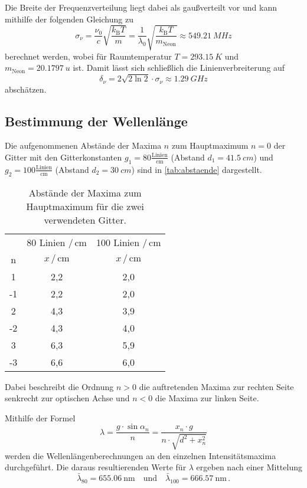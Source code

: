 Die Breite der Frequenzverteilung liegt dabei als gaußverteilt vor und kann mithilfe der folgenden Gleichung zu
\begin{equation*}
    \sigma_\nu = \frac{\nu_0}{c} \sqrt{\frac{k_{\mathrm{B}} T}{m}} = \frac{1}{\lambda_0} \sqrt{\frac{k_{\mathrm{B}} T}{m_\text{Neon}}} \approx \qty{549,21}{MHz}
\end{equation*}
berechnet werden, wobei für Raumtemperatur $T = \qty{293.15}{K}$ und $m_\text{Neon} = \qty{20.1797}{u}$ ist.
Damit lässt sich schließlich die Linienverbreiterung auf
\begin{equation*}
    \delta_\nu =2 \sqrt{2 \ln 2} \cdot \sigma_\nu \approx \qty{1.29}{GHz}
\end{equation*}
abschätzen.

\subsection{Bestimmung der Wellenlänge} \label{sec:lambda}
Die aufgenommenen Abstände der Maxima $n$ zum Hauptmaximum $n = 0$ der Gitter mit den Gitterkonstanten $g_1 = 80 \frac{\text{Linien}}{\unit{\centi\meter}}$ (Abstand $d_1 = \qty{41,5}{cm}$) und
$g_2 = 100 \frac{\text{Linien}}{\unit{\centi\meter}}$ (Abstand $d_2 = \qty{30}{cm}$) sind in \autoref{tab:abstaende} dargestellt.
\begin{table}
    \centering
    \caption{Abstände der Maxima zum Hauptmaximum für die zwei verwendeten Gitter.}
    \label{tab:abstaende}
    \begin{tabular}{c c c}
        \toprule
           &  80 Linien $/ \, \mathrm{cm}$ &  100 Linien $/ \, \mathrm{cm}$ \\
         n &  $x \, / \, \mathrm{cm}$ &  $x \, / \, \mathrm{cm}$ \\
        \midrule
         1 &     2,2 &       2,0 \\
        -1 &     2,2 &       2,0 \\
         2 &     4,3 &       3,9 \\
        -2 &     4,3 &       4,0 \\
         3 &     6,3 &       5,9 \\
        -3 &     6,6 &       6,0 \\
        \bottomrule
    \end{tabular}
\end{table}
Dabei beschreibt die Ordnung $n>0$ die auftretenden Maxima zur rechten Seite
senkrecht zur optischen Achse und $n<0$ die Maxima zur linken Seite.

Mithilfe der Formel
\begin{equation}
    \lambda=\frac{g \cdot \sin \alpha_n}{n} = \frac{x_n \cdot g}{n \cdot \sqrt{d^2+x_n^2}}
\end{equation} 
werden die Wellenlängenberechnungen an den einzelnen Intensitätsmaxima durchgeführt. 
Die daraus resultierenden Werte für $\lambda$ ergeben nach einer Mittelung
\begin{equation*}
    \bar{\lambda}_{80} = \qty{655.06}{\nano\meter} \quad \text{und} \quad
    \bar{\lambda}_{100} = \qty{666.57}{\nano\meter} \, .
\end{equation*}
